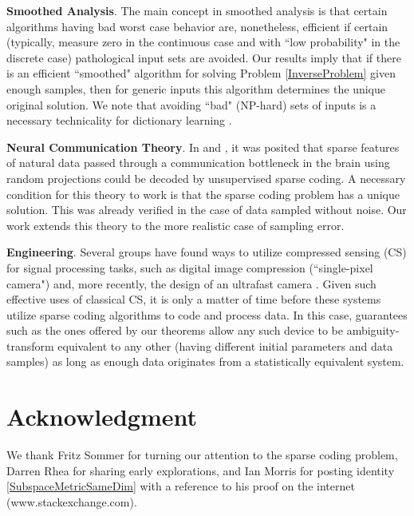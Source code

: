 \documentclass[journal, twocolumn]{IEEEtran}
\begin{document}
\textbf{Smoothed Analysis}.
The main concept in smoothed analysis \cite{Spielman04} is that certain algorithms having bad worst case behavior are, nonetheless, efficient if certain (typically, measure zero in the continuous case and with ``low probability" in the discrete case) pathological input sets are avoided. Our results imply that if there is an efficient ``smoothed" algorithm for solving Problem \ref{InverseProblem} given enough samples, then for generic inputs this algorithm determines the unique original solution. We note that avoiding ``bad" (NP-hard) sets of inputs is a necessary technicality for dictionary learning \cite{Razaviyayn15, Tillmann15}.

\textbf{Neural Communication Theory}.
In \cite{Coulter10} and \cite{Isely10}, it was posited that sparse features of natural data passed through a communication bottleneck in the brain using random projections could be decoded by unsupervised sparse coding.  A necessary condition for this theory to work is that the sparse coding problem has a unique solution.  This was already verified in the case of data sampled without noise.  Our work extends this theory to the more realistic case of sampling error.

\textbf{Engineering}.
Several groups have found ways to utilize compressed sensing (CS) for signal processing tasks, such as digital image compression \cite{Duarte08} (``single-pixel camera") and, more recently, the design of an ultrafast camera \cite{Gao14}. Given such effective uses of classical CS, it is only a matter of time before these systems utilize sparse coding algorithms to code and process data. In this case, guarantees such as the ones offered by our theorems allow any such device to be ambiguity-transform equivalent to any other (having different initial parameters and data samples) as long as enough data originates from a statistically equivalent system.

\section*{Acknowledgment}
We thank Fritz Sommer for turning our attention to the sparse coding problem, Darren Rhea for sharing early explorations, and Ian Morris for posting identity \eqref{SubspaceMetricSameDim} with a reference to his proof on the internet (www.stackexchange.com). %
\end{document}
